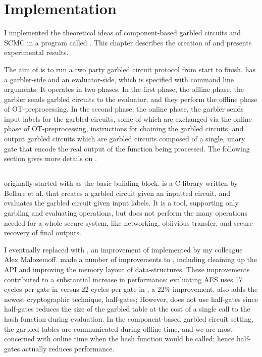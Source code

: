 
\chapter{Implementation}

I implemented the theoretical ideas of component-based garbled circuits and SCMC in a program called \CompGC. 
This chapter describes the creation of \CompGC and presents experimental results. 

The aim of \CompGC is to run a two party garbled circuit protocol from start to finish. 
\CompGC has a garbler-side and an evaluator-side, which is specified with command line arguments.
It operates in two phases.
In the first phase, the offline phase, the garbler sends garbled circuits to the evaluator, and they perform the offline phase of OT-preprocessing.
In the second phase, the online phase, the garbler sends input labels for the garbled circuits, some of which are exchanged via the online phase of OT-preprocessing, instructions for chaining the garbled circuits, and output garbled circuits which are garbled circuits composed of a single, unary gate that encode the real output of the function being processed.
The following section gives more details on \CompGC.

\section{\CompGC}
\CompGC originally started with \JustGarble as the basic building block.
\JustGarble is a C-library written by Bellare et al. \cite{justgarble} that creates a garbled circuit given an inputted circuit, and evaluates the garbled circuit given input labels. 
It is a tool, supporting only garbling and evaluating operations, but does not perform the many operations needed for a whole secure system, like networking, oblivious transfer, and secure recovery of final outputs. 

I eventually replaced \JustGarble with \LibGarble, an improvement of \JustGarble implemented by my colleague Alex Malozemoff.
\LibGarble made a number of improvements to \JustGarble, including cleaining up the API and improving the memory layout of  data-structures.
These improvements contributed to a substantial increase in performance: evaluating AES uses 17 cycles per gate in \LibGarble versus 22 cycles per gate in \JustGarble, a 22\% improvement. 
\LibGarble also adds the newest cryptographic technique, half-gates; However, \CompGC does not use half-gates since half-gates reduces the size of the garbled table at the cost of a single call to the hash function during evaluation. 
In the component-based garbled circuit setting, the garbled tables are communicated during offline time, and we are most concerned with online time when the hash function would be called; hence half-gates actually reduces performance.

